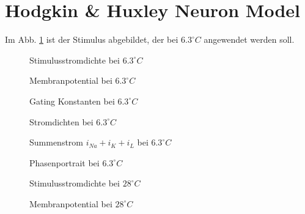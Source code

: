 \documentclass[conference]{IEEEtran}
\begin{document}
\section{Hodgkin \& Huxley Neuron Model}
Im Abb. \ref{fig:Stiumulus6} ist der Stimulus abgebildet, der bei $6.3^\circ C$ angewendet werden soll.
\begin{figure}[h!]
  	\centering
    \scalebox{.6}{}
    \caption{Stimulusstromdichte bei $6.3^\circ C$}
    \label{fig:Stiumulus6}
\end{figure}

\begin{figure}[h!]
  	\centering
    \scalebox{.6}{}
    \caption{Membranpotential bei $6.3^\circ C$}
    \label{fig:Membranpotential6}
\end{figure}

\begin{figure}[h!]
  	\centering
    \scalebox{.6}{}
    \caption{Gating Konstanten bei $6.3^\circ C$}
    \label{fig:Gating6}
\end{figure}

\begin{figure}[h!]
  	\centering
    \scalebox{.6}{}
    \caption{Stromdichten bei $6.3^\circ C$}
    \label{fig:Stromdichten6}
\end{figure}

\begin{figure}[h!]
  	\centering
    \scalebox{.6}{}
    \caption{Summenstrom $i_{Na}+i_K+i_L$ bei $6.3^\circ C$}
    \label{fig:Summenstrom6}
\end{figure}

\begin{figure}[h!]
  	\centering
    \scalebox{.6}{}
    \caption{Phasenportrait bei $6.3^\circ C$}
    \label{fig:Phasenportrait6}
\end{figure}

\begin{figure}[h!]
  	\centering
    \scalebox{.6}{}
    \caption{Stimulusstromdichte bei $28^\circ C$}
    \label{fig:Stiumulus28}
\end{figure}

\begin{figure}[h!]
  	\centering
    \scalebox{.6}{}
    \caption{Membranpotential bei $28^\circ C$}
    \label{fig:Membranpotential28}
\end{figure}
\end{document}
